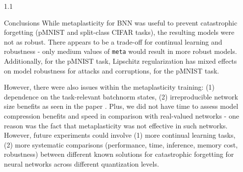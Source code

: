 \documentclass[aspectratio=32, final]{beamer}
\newlength{\sepwidth}
\newlength{\colwidth}
\newcommand{\separatorcolumn}{\begin{column}{\sepwidth}\end{column}}
\begin{document}
\begin{frame}[t]
\begin{columns}[t]
\begin{column}{1.1\colwidth}
  \begin{block}{Conclusions}
    While metaplasticity for BNN was useful to prevent catastrophic forgetting (pMNIST and split-class CIFAR tasks), the resulting models were not as robust. There appears to be a trade-off for continual learning and robustness - only medium values of \texttt{meta} would result in more robust models. Additionally, for the pMNIST task, Lipschitz regularization has mixed effects on model robustness for attacks and corruptions, for the pMNIST task.
    
    However, there were also issues within the metaplasticity training: (1) dependence on the task-relevant batchnorm states, (2) irreproducible network size benefits as seen in the paper \cite{Laborieux2021-pv}. Plus, we did not have time to assess model compression benefits and speed in comparison with real-valued networks - one reason was the fact that metaplasticity was not effective in such networks. However, future experiments could involve (1) more continual learning tasks, (2) more systematic comparisons (performance, time, inference, memory cost, robustness) between different known solutions for catastrophic forgetting for neural networks across different quantization levels.
    

    \tiny{
        
        
    }
  \end{block}

  




\end{column}

\separatorcolumn



\end{columns}

\end{frame}
\end{document}
